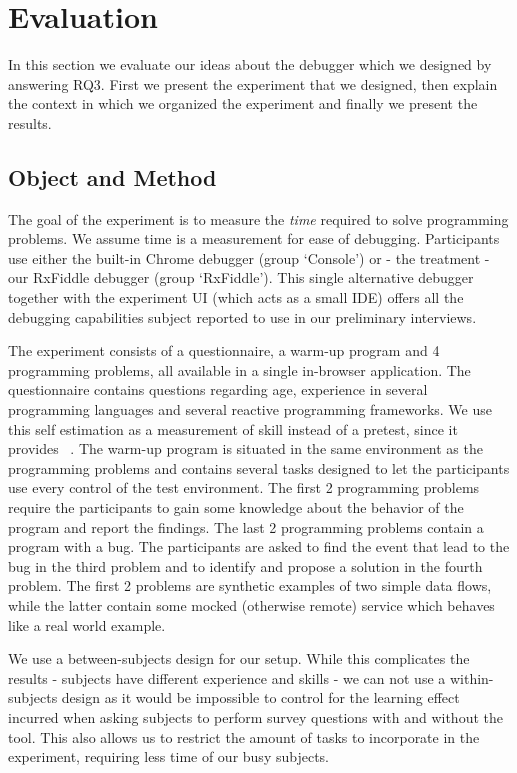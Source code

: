 \section{Evaluation}
In this section we evaluate our ideas about the debugger which we designed by answering RQ3. First we present the experiment that we designed, then explain the context in which we organized the experiment and finally we present the results.

\subsection{Object and Method}
The goal of the experiment is to measure the \textit{time} required to solve programming problems. We assume time is a measurement for ease of debugging. Participants use either the built-in Chrome debugger (group `Console') or - the treatment - our RxFiddle debugger (group `RxFiddle'). This single alternative debugger together with the experiment UI (which acts as a small IDE) offers all the debugging capabilities subject reported to use in our preliminary interviews.

The experiment consists of a questionnaire, a warm-up program and 4 programming problems, all available in a single in-browser application. The questionnaire contains questions regarding age, experience in several programming languages and several reactive programming frameworks. We use this self estimation as  a measurement of skill instead of a pretest, since it provides ~\cite{kleinschmager2011rate,feigenspan2012measuring,siegmund2014measuring}. The warm-up program is situated in the same environment as the programming problems and contains several tasks designed to let the participants use every control of the test environment. The first 2 programming problems require the participants to gain some knowledge about the behavior of the program and report the findings. The last 2 programming problems contain a program with a bug. The participants are asked to find the event that lead to the bug in the third problem and to identify and propose a solution in the fourth problem. The first 2 problems are synthetic examples of two simple data flows, while the latter contain some mocked (otherwise remote) service which behaves like a real world example.

We use a between-subjects design for our setup. While this complicates the results - subjects have different experience and skills - we can not use a within-subjects design as it would be impossible to control for the learning effect incurred when asking subjects to perform survey questions with and without the tool. This also allows us to restrict the amount of tasks to incorporate in the experiment, requiring less time of our busy subjects.


